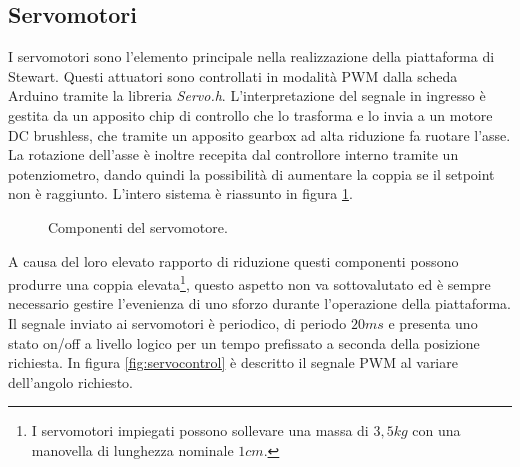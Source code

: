 \documentclass[11pt]{article}
\begin{document}
\subsection{Servomotori}\label{servomotori}
I servomotori sono l'elemento principale nella realizzazione della piattaforma di Stewart. Questi attuatori sono controllati in modalità PWM dalla scheda Arduino tramite la libreria \emph{Servo.h}. L'interpretazione del segnale in ingresso è gestita da un apposito chip di controllo che lo trasforma e lo invia a un motore DC brushless, che tramite un apposito gearbox ad alta riduzione fa ruotare l'asse. La rotazione dell'asse è inoltre recepita dal controllore interno tramite un potenziometro, dando quindi la possibilità di aumentare la coppia se il setpoint non è raggiunto. L'intero sistema è riassunto in figura \ref{fig:servo}. 
\begin{figure}[h!]
\centering
{}
\caption{Componenti del servomotore.} \label{fig:servo}
\end{figure}
A causa del loro elevato rapporto di riduzione questi componenti possono produrre una coppia elevata\footnote{I servomotori impiegati possono sollevare una massa di $3,5kg$ con una manovella di lunghezza nominale $1cm$.}, questo aspetto  non va sottovalutato ed è sempre necessario gestire l'evenienza di uno sforzo durante l'operazione della piattaforma.
Il segnale inviato ai servomotori è periodico, di periodo $20ms$ e presenta uno stato on/off a livello logico per un tempo prefissato a seconda della posizione richiesta. In figura \ref{fig:servocontrol} è descritto il segnale PWM al variare dell'angolo richiesto. 
\end{document}
